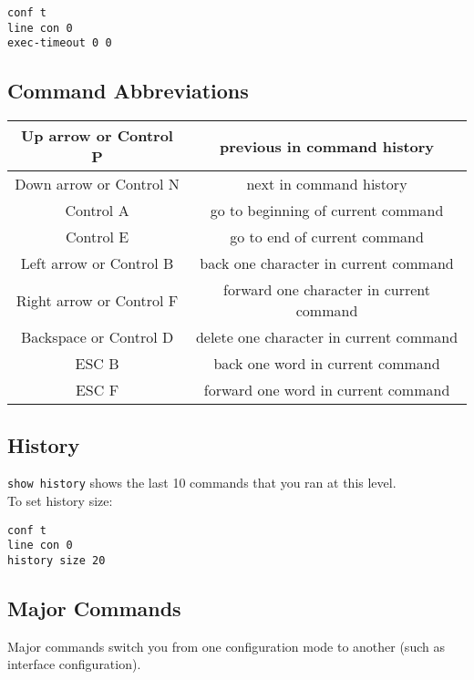 \begin{verbatim}
conf t
line con 0
exec-timeout 0 0
\end{verbatim}

\subsection{Command Abbreviations}

\begin{tabular}{ | c | c | }
\hline
Up arrow or Control P & previous in command history \\ \hline
Down arrow or Control N & next in command history \\ \hline
Control A & go to beginning of current command \\ \hline
Control E & go to end of current command \\ \hline
Left arrow or Control B & back one character in current command \\ \hline
Right arrow or Control F & forward one character in current command \\ \hline
Backspace or Control D & delete one character in current command \\ \hline
ESC B & back one word in current command \\ \hline
ESC F & forward one word in current command \\ \hline
\end{tabular}

\subsection{History}

\texttt{show history} shows the last 10 commands that you ran at this level.\\

To set history size:

\begin{verbatim}
conf t
line con 0
history size 20
\end{verbatim}

\subsection{Major Commands}

Major commands switch you from one configuration mode to another (such as
interface configuration).
